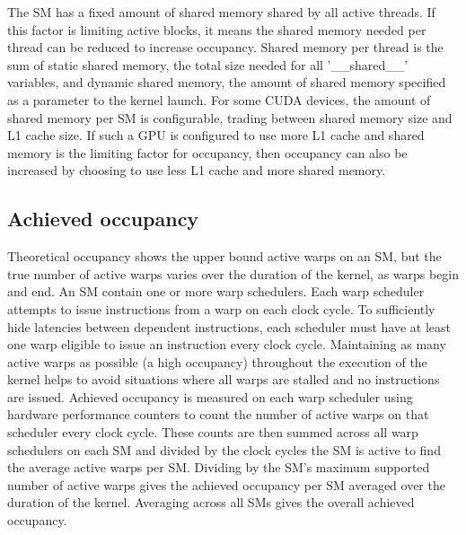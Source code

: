 \documentclass[oneside,openright,12pt,final,en]{mgr}
\begin{document}
\begin{itemize}
	The SM has a fixed amount of shared memory shared by all active threads. If this factor is limiting active blocks, it means the shared memory needed per thread can be reduced to increase occupancy. Shared memory per thread is the sum of static shared memory, the total size needed for all '\_\_shared\_\_' variables, and dynamic shared memory, the amount of shared memory specified as a parameter to the kernel launch. For some CUDA devices, the amount of shared memory per SM is configurable, trading between shared memory size and L1 cache size. If such a GPU is configured to use more L1 cache and shared memory is the limiting factor for occupancy, then occupancy can also be increased by choosing to use less L1 cache and more shared memory.
\end{itemize}

\subsection{Achieved occupancy}
Theoretical occupancy shows the upper bound active warps on an SM, but the true number of active warps varies over the duration of the kernel, as warps begin and end. An SM contain one or more warp schedulers. Each warp scheduler attempts to issue instructions from a warp on each clock cycle. To sufficiently hide latencies between dependent instructions, each scheduler must have at least one warp eligible to issue an instruction every clock cycle. Maintaining as many active warps as possible (a high occupancy) throughout the execution of the kernel helps to avoid situations where all warps are stalled and no instructions are issued. Achieved occupancy is measured on each warp scheduler using hardware performance counters to count the number of active warps on that scheduler every clock cycle. These counts are then summed across all warp schedulers on each SM and divided by the clock cycles the SM is active to find the average active warps per SM. Dividing by the SM's maximum supported number of active warps gives the achieved occupancy per SM averaged over the duration of the kernel. Averaging across all SMs gives the overall achieved occupancy.
\end{document}
